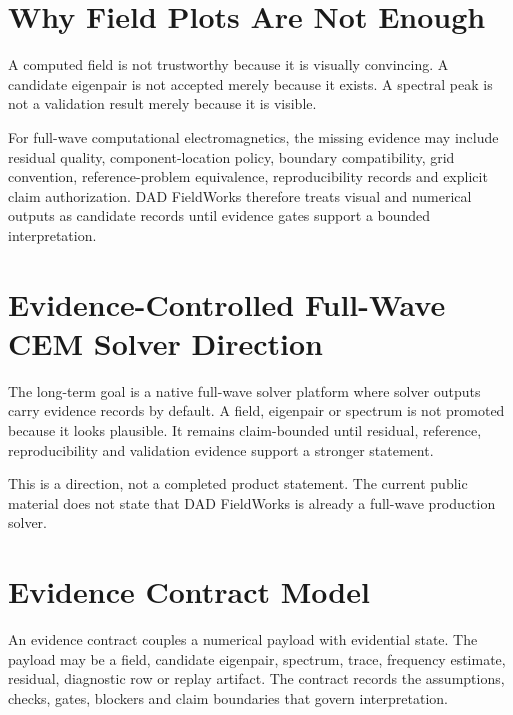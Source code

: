 \documentclass[11pt,a4paper]{article}
\begin{document}
\section{Why Field Plots Are Not Enough}

A computed field is not trustworthy because it is visually convincing. A candidate eigenpair is not accepted merely because it exists. A spectral peak is not a validation result merely because it is visible.

For full-wave computational electromagnetics, the missing evidence may include residual quality, component-location policy, boundary compatibility, grid convention, reference-problem equivalence, reproducibility records and explicit claim authorization. DAD FieldWorks therefore treats visual and numerical outputs as candidate records until evidence gates support a bounded interpretation.

\section{Evidence-Controlled Full-Wave CEM Solver Direction}

The long-term goal is a native full-wave solver platform where solver outputs carry evidence records by default. A field, eigenpair or spectrum is not promoted because it looks plausible. It remains claim-bounded until residual, reference, reproducibility and validation evidence support a stronger statement.

This is a direction, not a completed product statement. The current public material does not state that DAD FieldWorks is already a full-wave production solver.

\section{Evidence Contract Model}

An evidence contract couples a numerical payload with evidential state. The payload may be a field, candidate eigenpair, spectrum, trace, frequency estimate, residual, diagnostic row or replay artifact. The contract records the assumptions, checks, gates, blockers and claim boundaries that govern interpretation.
\end{document}
